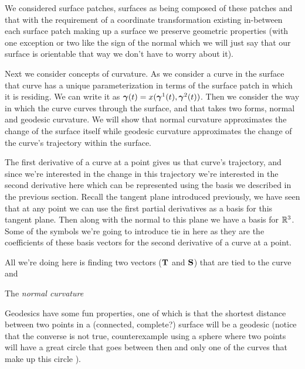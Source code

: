 We considered surface patches, surfaces as being composed of these patches and that with the requirement of a coordinate transformation existing in-between each surface patch making up a surface we preserve geometric properties (with one exception or two like the sign of the normal which we will just say that our surface is orientable that way we don't have to worry about it). 

Next we consider concepts of curvature. As we consider a curve in the surface that curve has a unique parameterization in terms of the surface patch in which it is residing. We can write it as $\boldsymbol{\gamma}(t) = x(\boldsymbol{\gamma}^1(t), \boldsymbol{\gamma}^2(t))$. Then we consider the way in which the curve curves through the surface, and that takes two forms, normal and geodesic curvature. We will show that normal curvature approximates the change of the surface itself while geodesic curvature approximates the change of the curve's trajectory within the surface. 

The first derivative of a curve at a point gives us that curve's trajectory, and since we're interested in the change in this trajectory we're interested in the second derivative here which can be represented using the basis we described in the previous section. Recall the tangent plane introduced previously, we have seen that at any point we can use the first partial derivatives as a basis for this tangent plane. Then along with the normal to this plane we have a basis for $\mathbb{R}^3$. Some of the symbols we're going to introduce tie in here as they are the coefficients of these basis vectors for the second derivative of a curve at a point.

All we're doing here is finding two vectors ($\mathbf{T}$ and $\mathbf{S}$) that are tied to the curve and 

\begin{defn} %
  The \emph{normal curvature}

\end{defn}



Geodesics have some fun properties, one of which is that the shortest distance between two points in a (connected, complete?) surface will be a geodesic (notice that the converse is not true, counterexample using a sphere where two points will have a great circle that goes between then and only one of the curves that make up this circle ).

